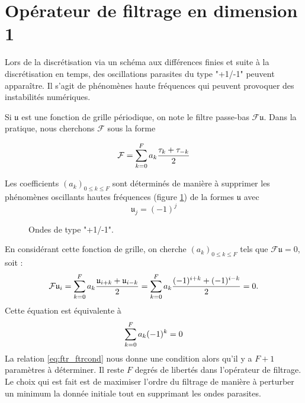 \section{Opérateur de filtrage en dimension 1}

Lors de la discrétisation via un schéma aux différences finies et suite à la discrétisation en temps, des oscillations parasites du type "+1/-1" peuvent apparaître. Il s'agit de phénomènes haute fréquences qui peuvent provoquer des instabilités numériques. 

Si $\mathfrak{u}$ est une fonction de grille périodique, on note le filtre passe-bas $\mathcal{F}\mathfrak{u}$. Dans la pratique, nous cherchons $\mathcal{F}$ sous la forme 

\begin{equation}
\mathcal{F} = \displaystyle\sum\limits_{k=0}^F a_k \dfrac{\tau_k + \tau_{-k}}{2}
\label{eq:ftr}
\end{equation}

Les coefficients $(a_k)_{0 \leq k \leq F}$ sont déterminés de manière à supprimer les phénomènes oscillants hautes fréquences (figure \ref{fig:hf_waves}) de la formes $\mathfrak{u}$ avec 
\begin{equation}
\mathfrak{u}_j = (-1)^j
\end{equation}

\begin{figure}[htbp]
\begin{center}
\end{center}
\caption{Ondes de type "+1/-1".}
\label{fig:hf_waves}
\end{figure}


En considérant cette fonction de grille, on cherche $(a_k)_{0\leq k \leq F}$ tels que $\mathcal{F} \mathfrak{u} = \mathfrak{0}$, soit :
\begin{equation}
\mathcal{F}\mathfrak{u}_i = \displaystyle\sum\limits_{k=0}^F a_k \dfrac{\mathfrak{u}_{i+k} + \mathfrak{u}_{i-k}}{2} = \displaystyle\sum\limits_{k=0}^F a_k  \dfrac{(-1)^{i+k} + (-1)^{i-k}}{2} = 0.
\end{equation}
Cette équation est équivalente à 
\begin{equation}
\displaystyle\sum\limits_{k=0}^F a_k (-1)^k = 0
\label{eq:ftr_ftrcond}
\end{equation}
La relation \eqref{eq:ftr_ftrcond} nous donne une condition alors qu'il y a $F+1$ paramètres à déterminer. Il reste $F$ degrés de libertés dans l'opérateur de filtrage. Le choix qui est fait est de maximiser l'ordre du filtrage de manière à perturber un minimum la donnée initiale tout en supprimant les ondes parasites.

